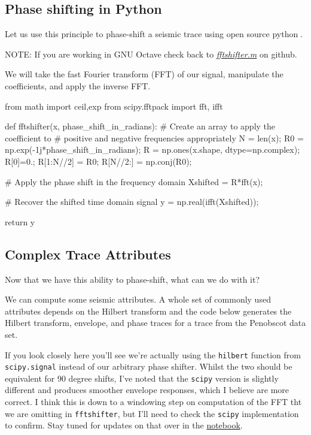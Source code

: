 \subsection*{Phase shifting in Python 🐍}

Let us use this principle to phase-shift a seismic trace using open source python💪.

\begin{aside}
  NOTE: If you are working in GNU Octave check back to \href{https://github.com/seg/tutorials-2014/blob/master/1410_Phase/fftshifter.m}{\textit{fftshifter.m}} on github.
\end{aside}

We will take the fast Fourier transform (FFT) of our signal, manipulate the coefficients, and apply the inverse FFT.

\begin{code}[python]
from math import ceil,exp
from scipy.fftpack import fft, ifft

def fftshifter(x, phase_shift_in_radians):
    # Create an array to apply the coefficient to
    # positive and negative frequencies appropriately
    N = len(x);
    R0 = np.exp(-1j*phase_shift_in_radians);
    R = np.ones(x.shape, dtype=np.complex);
    R[0]=0.;
    R[1:N//2] = R0;
    R[N//2:] = np.conj(R0);

    # Apply the phase shift in the frequency domain
    Xshifted = R*fft(x);

    # Recover the shifted time domain signal
    y = np.real(ifft(Xshifted));

    return y
\end{code}

\subsection*{Complex Trace Attributes}

Now that we have this ability to phase-shift, what can we do with it?

We can compute some seismic attributes. A whole set of commonly used attributes depends on the Hilbert transform and the code below generates the Hilbert transform, envelope, and phase traces for a trace from the Penobscot data set.

\begin{aside}
  If you look closely here you’ll see we’re actually using the \texttt{hilbert} function from \texttt{scipy.signal} instead of our arbitrary phase shifter. Whilst the two should be equivalent for 90 degree shifts, I’ve noted that the \texttt{scipy} version is slightly different and produces smoother envelope responses, which I believe are more correct. I think this is down to a windowing step on computation of the FFT tht we are omitting in \texttt{fftshifter}, but I’ll need to check the \texttt{scipy} implementation to confirm. Stay tuned for updates on that over in the \href{https://iooxa.com/@stevejpurves/geoscience/phaseandhilbert}{notebook}.
\end{aside}

